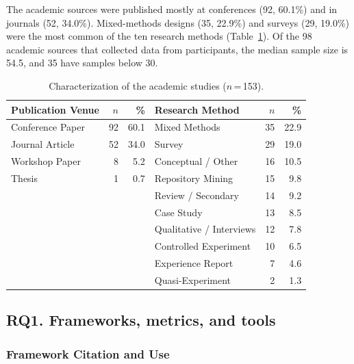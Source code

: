 \documentclass[preprint,number]{elsarticle}
\newcounter{study}
\begin{document}
The academic sources were published mostly at conferences (92, 60.1\%) and in journals (52, 34.0\%). Mixed-methods designs (35, 22.9\%) and surveys (29, 19.0\%) were the most common of the ten research methods (Table~\ref{tab:study_char}). Of the 98 academic sources that collected data from participants, the median sample size is 54.5, and 35 have samples below 30.

\begin{table}[htbp]
\centering
\caption{Characterization of the academic studies ($n$\,=\,153).}
\label{tab:study_char}
\footnotesize
\begin{tabular}{l r r | l r r}
\toprule
\textbf{Publication Venue} & \textbf{$n$} & \textbf{\%} & \textbf{Research Method} & \textbf{$n$} & \textbf{\%} \\
\midrule
Conference Paper     & 92 & 60.1 & Mixed Methods            & 35 & 22.9 \\
Journal Article      & 52 & 34.0 & Survey                   & 29 & 19.0 \\
Workshop Paper       & 8  & 5.2  & Conceptual / Other       & 16 & 10.5 \\
Thesis               & 1  & 0.7  & Repository Mining        & 15 & 9.8  \\
                     &    &      & Review / Secondary       & 14 & 9.2  \\
                     &    &      & Case Study               & 13 & 8.5  \\
                     &    &      & Qualitative / Interviews & 12 & 7.8  \\
                     &    &      & Controlled Experiment    & 10 & 6.5  \\
                     &    &      & Experience Report        & 7  & 4.6  \\
                     &    &      & Quasi-Experiment         & 2  & 1.3  \\
\bottomrule
\end{tabular}
\end{table}

\subsection{RQ1. Frameworks, metrics, and tools}
\label{sec:rq1}

\subsubsection{Framework Citation and Use}
\end{document}
